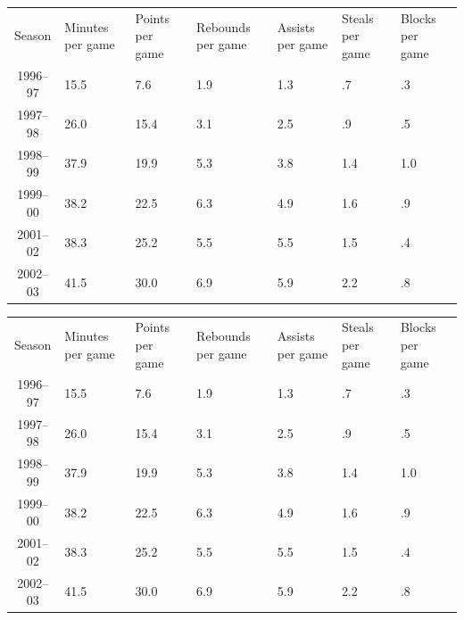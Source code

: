	\begin{table}
		\centering
		\begin{tabularx}{\textwidth}{| c | X | X | X | X | X | X |}
			\rowcolor{lal-p!60}
			Season  & Minutes per game  & Points per game  & Rebounds per game & Assists per game &	Steals per game & Blocks per game \\
			1996–97 & 15.5 & 7.6  & 1.9 & 1.3 &  .7	&  .3 \\
			1997–98	& 26.0 & 15.4 &	3.1	& 2.5 &	 .9	&  .5 \\
			1998–99	& 37.9 & 19.9 &	5.3 & 3.8 &	1.4	& 1.0 \\
			1999–00	& 38.2 & 22.5 &	6.3	& 4.9 &	1.6	&  .9 \\
			2001–02 & 38.3 & 25.2 &	5.5	& 5.5 &	1.5	&  .4 \\
			2002–03 & 41.5 & 30.0 & 6.9 & 5.9 & 2.2 &  .8 \\
		\end{tabularx}
	\end{table}

	

	\begin{table}
	\centering
		\begin{tabularx}{\textwidth}{| c | Y | Y | Y | Y | Y | Y |}
			Season  & Minutes per game  & Points per game  & Rebounds per game & Assists per game &	Steals per game & Blocks per game \\
			1996–97 & 15.5 & 7.6  & 1.9 & 1.3 &  .7	&  .3 \\
			1997–98	& 26.0 & 15.4 &	3.1	& 2.5 &	 .9	&  .5 \\
			1998–99	& 37.9 & 19.9 &	5.3 & 3.8 &	1.4	& 1.0 \\
			1999–00	& 38.2 & 22.5 &	6.3	& 4.9 &	1.6	&  .9 \\
			2001–02 & 38.3 & 25.2 &	5.5	& 5.5 &	1.5	&  .4 \\
			2002–03 & 41.5 & 30.0 & 6.9 & 5.9 & 2.2 &  .8 \\
		\end{tabularx}
	\end{table}
